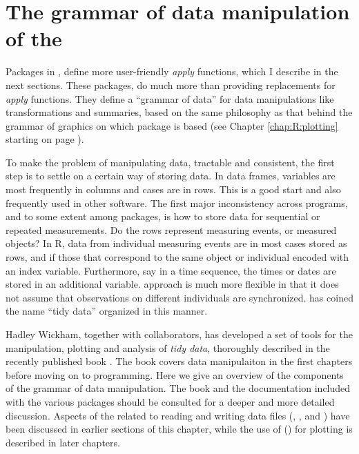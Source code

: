 \documentclass[krantz2]{krantz}\usepackage{knitr}%
\begin{document}
\section[Grammar of data manipulation]{The grammar of data manipulation of the }

Packages in , define more user-friendly \emph{apply} functions, which I describe in the next sections. These packages, do much more than providing replacements for \Rlang \emph{apply} functions. They define a ``grammar of data'' for data manipulations like transformations and summaries, based on the same philosophy as that behind the grammar of graphics on which package  is based (see Chapter \ref{chap:R:plotting} starting on page \pageref{chap:R:plotting}).

To make the problem of manipulating data, tractable and consistent, the first step is to settle on a certain way of storing data. In \Rlang data frames, variables are most frequently in columns and cases are in rows. This is a good start and also frequently used in other software. The first major inconsistency across programs, and to some extent among \Rlang packages, is how to store data for sequential or repeated measurements. Do the rows represent measuring events, or measured objects? In R, data from individual measuring events are in most cases stored as rows, and if those that correspond to the same object or individual encoded with an index variable. Furthermore, say in a time sequence, the times or dates are stored in an additional variable. \Rlang approach is much more flexible in that it does not assume that observations on different individuals are synchronized. \citeauthor{Wickham2014a} \cite{Wickham2014a} has coined the name ``tidy data'' organized in this manner.

Hadley Wickham, together with collaborators, has developed a set of \Rlang tools for the manipulation, plotting and analysis of \emph{tidy data}, thoroughly described in the recently published book  \autocite{Wickham2017}. The book  \autocite{Peng2017} covers data manipulaiton in the first chapters before moving on to programming. Here we give an overview of the components of the  grammar of data manipulation. The book  and the documentation included with the various packages should be consulted for a deeper and more detailed discussion. Aspects of the  related to reading and writing data files (, , and ) have been discussed in earlier sections of this chapter, while the use of () for plotting is described in later chapters.
\end{document}
